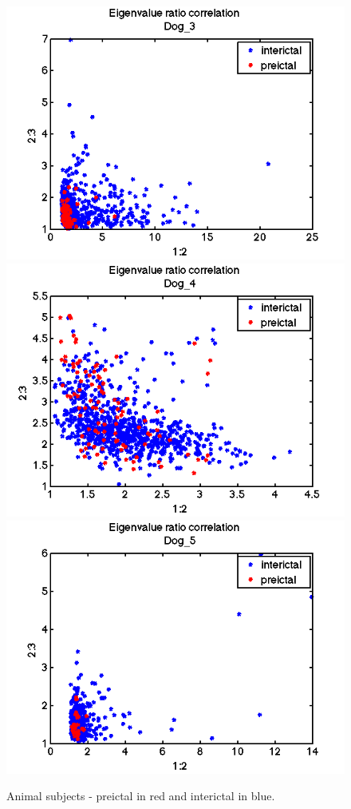 \documentclass[11pt]{article}
\begin{document}
\begin{figure}[H]
\includegraphics[width=\plotWidth\textwidth]{pictures/evalRatioScatter_dog3.png}
\includegraphics[width=\plotWidth\textwidth]{pictures/evalRatioScatter_dog4.png}
\includegraphics[width=\plotWidth\textwidth]{pictures/evalRatioScatter_dog5.png}
\caption{Animal subjects - preictal in red and interictal in blue.}
\end{figure}
\end{document}

